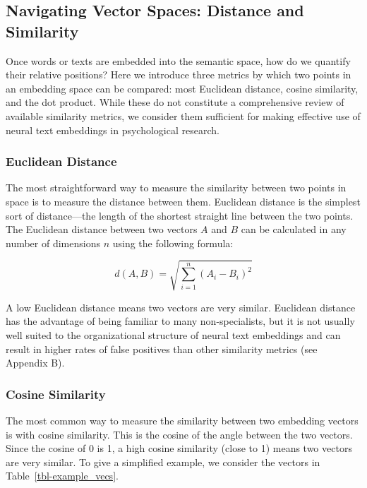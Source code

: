 \documentclass[
  man,
  floatsintext,
  longtable,
  nolmodern,
  notxfonts,
  notimes,
  colorlinks=true,linkcolor=blue,citecolor=blue,urlcolor=blue]{apa7}
\begin{document}
\subsection{Navigating Vector Spaces: Distance and
Similarity}\label{navigating-vector-spaces-distance-and-similarity}

Once words or texts are embedded into the semantic space, how do we
quantify their relative positions? Here we introduce three metrics by
which two points in an embedding space can be compared: most Euclidean
distance, cosine similarity, and the dot product. While these do not
constitute a comprehensive review of available similarity metrics, we
consider them sufficient for making effective use of neural text
embeddings in psychological research.

\subsubsection{Euclidean Distance}\label{euclidean-distance}

The most straightforward way to measure the similarity between two
points in space is to measure the distance between them. Euclidean
distance is the simplest sort of distance---the length of the shortest
straight line between the two points. The Euclidean distance between two
vectors \(A\) and \(B\) can be calculated in any number of dimensions
\(n\) using the following formula:

\[
d\left( A,B\right)   = \sqrt {\sum _{i=1}^{n}  \left( A_{i}-B_{i}\right)^2 }
\]

A low Euclidean distance means two vectors are very similar. Euclidean
distance has the advantage of being familiar to many non-specialists,
but it is not usually well suited to the organizational structure of
neural text embeddings and can result in higher rates of false positives
than other similarity metrics (see Appendix B).

\subsubsection{Cosine Similarity}\label{cosine-similarity}

The most common way to measure the similarity between two embedding
vectors is with cosine similarity. This is the cosine of the angle
between the two vectors. Since the cosine of 0 is 1, a high cosine
similarity (close to 1) means two vectors are very similar. To give a
simplified example, we consider the vectors in
Table~\ref{tbl-example_vecs}.
\end{document}
